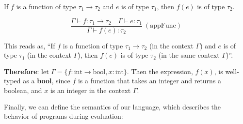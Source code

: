 \vspace{-1em}
\begin{Example}

    \label{ex:function_application}
    
    If $f$ is a function of type $\tau_1 \rightarrow \tau_2$ and $e$ is of type $\tau_1$, then $f(e)$ is of type $\tau_2$.
    \LARGE

    \[
    \frac{\Gamma \vdash f : \tau_1 \rightarrow \tau_2 \quad \Gamma \vdash e : \tau_1}{\Gamma \vdash f(e) : \tau_2} \ (\text{appFunc})
    \]

    \vspace{.5em}
    \normalsize
    \noindent
    This reads as, ``If $f$ is a function of type $\tau_1 \rightarrow \tau_2$ (in the context $\Gamma$) and $e$ is of type $\tau_1$ 
    (in the context $\Gamma$), then $f(e)$ is of type $\tau_2$ (in the same context $\Gamma$)''.

    \vspace{1em}
    \noindent
    \textbf{Therefore}: let $\Gamma = \{f : \text{int} \rightarrow \text{bool}, x : \text{int}\}$. Then the expression, $f(x)$, 
    is well-typed as a \textbf{bool}, since $f$ is a function that takes an integer and returns a boolean, and $x$ is an integer 
    in the context $\Gamma$.
\end{Example}

\newpage 

\noindent
Finally, we can define the semantics of our language, which describes the behavior of programs during evaluation:

